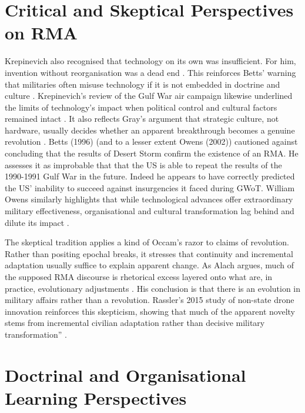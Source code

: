 \section{Critical and Skeptical Perspectives on RMA}

Krepinevich also recognised that technology on its own was insufficient. For him, invention without reorganisation was a dead end \parencite{KREPINEVICH_1992}. This reinforces Betts’ warning that militaries often misuse technology if it is not embedded in doctrine and culture \parencite{BETTS_1996}. Krepinevich’s review of the Gulf War air campaign likewise underlined the limits of technology’s impact when political control and cultural factors remained intact \parencite{KREPINEVICH_1996}. It also reflects Gray’s argument that strategic culture, not hardware, usually decides whether an apparent breakthrough becomes a genuine revolution \parencite{GRAY_2005}. Betts (1996) (and to a lesser extent Owens (2002)\nocite{OWENS_2002}) cautioned against concluding that the results of Desert Storm confirm the existence of an RMA. He assesses it as improbable that that the US is able to repeat the results of the 1990-1991 Gulf War in the future. Indeed he appears to have correctly predicted the US' inability to succeed against insurgencies it faced during GWoT. William Owens  similarly highlights that while technological advances offer extraordinary military effectiveness, organisational and cultural transformation lag behind and dilute its impact \parencite{OWENS_2002}. 

The skeptical tradition applies a kind of Occam’s razor to claims of revolution. Rather than positing epochal breaks, it stresses that continuity and incremental adaptation usually suffice to explain apparent change. As Alach argues, much of the supposed RMA discourse is rhetorical excess layered onto what are, in practice, evolutionary adjustments \parencite[.p~50-52]{ALACH_2008}. His conclusion is that there is an evolution in military affairs rather than a revolution. Rassler’s 2015 study of non-state drone innovation reinforces this skepticism, showing that much of the apparent novelty stems from incremental civilian adaptation rather than decisive military transformation”  \parencite{RASSLER_2015}.

\section{Doctrinal and Organisational Learning Perspectives}

